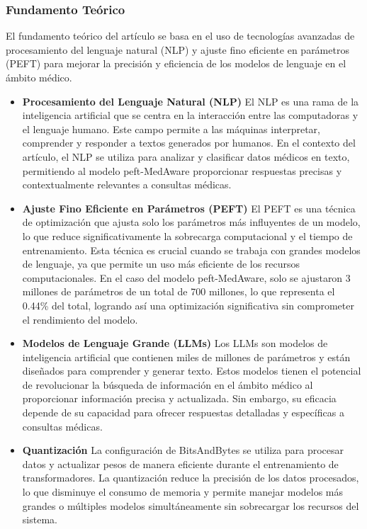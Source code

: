 		
	\subsubsection{Fundamento Teórico}
		El fundamento teórico del artículo se basa en el uso de tecnologías avanzadas de procesamiento del lenguaje natural (NLP) y ajuste fino eficiente en parámetros (PEFT) para mejorar la precisión y eficiencia de los modelos de lenguaje en el ámbito médico.
	
		\begin{itemize}
			
			\item \textbf{Procesamiento del Lenguaje Natural (NLP)}
			El NLP es una rama de la inteligencia artificial que se centra en la interacción entre las computadoras y el lenguaje humano. Este campo permite a las máquinas interpretar, comprender y responder a textos generados por humanos. En el contexto del artículo, el NLP se utiliza para analizar y clasificar datos médicos en texto, permitiendo al modelo peft-MedAware proporcionar respuestas precisas y contextualmente relevantes a consultas médicas.
			
			\item \textbf{Ajuste Fino Eficiente en Parámetros (PEFT)}
			El PEFT es una técnica de optimización que ajusta solo los parámetros más influyentes de un modelo, lo que reduce significativamente la sobrecarga computacional y el tiempo de entrenamiento. Esta técnica es crucial cuando se trabaja con grandes modelos de lenguaje, ya que permite un uso más eficiente de los recursos computacionales. En el caso del modelo peft-MedAware, solo se ajustaron 3 millones de parámetros de un total de 700 millones, lo que representa el 0.44\% del total, logrando así una optimización significativa sin comprometer el rendimiento del modelo.
			
			\item \textbf{Modelos de Lenguaje Grande (LLMs)}
			Los LLMs son modelos de inteligencia artificial que contienen miles de millones de parámetros y están diseñados para comprender y generar texto. Estos modelos tienen el potencial de revolucionar la búsqueda de información en el ámbito médico al proporcionar información precisa y actualizada. Sin embargo, su eficacia depende de su capacidad para ofrecer respuestas detalladas y específicas a consultas médicas.
			
				\item \textbf{Quantización}
			La configuración de BitsAndBytes se utiliza para procesar datos y actualizar pesos de manera eficiente durante el entrenamiento de transformadores. La quantización reduce la precisión de los datos procesados, lo que disminuye el consumo de memoria y permite manejar modelos más grandes o múltiples modelos simultáneamente sin sobrecargar los recursos del sistema.
			

\end{itemize}
